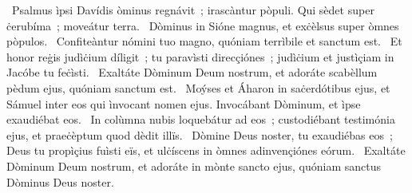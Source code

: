{~Psalmus ìpsi Davídis}
{%
òminus regnávit~; irascàntur pòpuli. Qui sèdet super ċerubíma~; moveátur terra.
~Dòminus in Sióne magnus, et exċèlsus super òmnes pòpulos.
~Confiteàntur nómini tuo magno, quóniam terrìbile et sanctum est.
~Et honor reġis judìċium díligit~; tu paravìsti direcçiónes~; judìċium et justìçiam in Jacóbe tu feċìsti.
~Exaltáte Dòminum Deum nostrum, et adoráte scabèllum pèdum ejus, quóniam sanctum est.
~Moýses et Áharon in saċerdótibus ejus, et Sámuel inter eos qui ìnvocant nomen ejus. Invocábant Dòminum, et ìpse exaudiébat eos.
~In colùmna nubis loquebátur ad eos~; custodiébant testimónia ejus, et praeċèptum quod dèdit illïs.
~Dòmine Deus noster, tu exaudiébas eos~; Deus tu propìçius fuìsti eïs, et ulċíscens in òmnes adinvençiónes eórum.
~Exaltáte Dòminum Deum nostrum, et adoráte in mònte sancto ejus, quóniam sanctus Dòminus Deus noster.}
